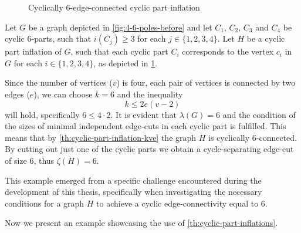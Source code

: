 \documentclass[12pt, twoside]{book}
\begin{document}
\begin{example}
\begin{figure}
		\caption{Cyclically 6-edge-connected cyclic part inflation}
		\label{fig:4-6-poles-inflation}
	\end{figure}

	Let $G$ be a graph depicted in \cref{fig:4-6-poles-before} and let $C_1,\,C_2,\,C_3$ and $C_4$ be cyclic 6-parts, such that $i(C_j)\geq 3$ for each $j\in\{1,2,3,4\}$. Let $H$ be a cyclic part inflation of $G$, such that each cyclic part $C_i$ corresponds to the vertex $c_i$ in $G$ for each $i\in\{1,2,3,4\}$, as depicted in \cref{fig:4-6-poles-inflation}.
	
	Since the number of vertices ($v$) is four, each pair of vertices is connected by two edges ($e$), we can choose $k=6$ and the inequality 
	$$k\leq 2e(v-2)$$
	will hold, specifically $6\leq 4\cdot 2$. It is evident that $\lambda(G)=6$ and the condition of the sizes of minimal independent edge-cuts in each cyclic part is fulfilled. This means that by \cref{th:cyclic-part-inflation-kve} the graph $H$ is cyclically 6-connected. By cutting out just one of the cyclic parts we obtain a cycle-separating edge-cut of size 6, thus $\zeta(H)=6$.
	
	This example emerged from a specific challenge encountered during the development of this thesis, specifically when investigating the necessary conditions for a graph $H$ to achieve a cyclic edge-connectivity equal to 6.
\end{example}

Now we present an example showcasing the use of \cref{th:cyclic-part-inflations}.
\end{document}
